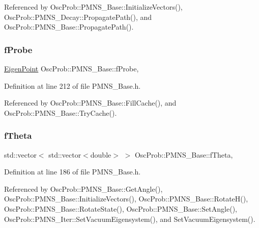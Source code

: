 Referenced by Osc\+Prob\+::\+P\+M\+N\+S\+\_\+\+Base\+::\+Initialize\+Vectors(), Osc\+Prob\+::\+P\+M\+N\+S\+\_\+\+Decay\+::\+Propagate\+Path(), and Osc\+Prob\+::\+P\+M\+N\+S\+\_\+\+Base\+::\+Propagate\+Path().

\mbox{\label{classOscProb_1_1PMNS__Base_ab1fe4800ee3ae48df4fc942dce00e0d3}} 
\subsubsection{\texorpdfstring{f\+Probe}{fProbe}}
{\footnotesize\ttfamily \hyperlink{structOscProb_1_1EigenPoint}{Eigen\+Point} Osc\+Prob\+::\+P\+M\+N\+S\+\_\+\+Base\+::f\+Probe\hspace{0.3cm}{\ttfamily [protected]}, {\ttfamily [inherited]}}



Definition at line 212 of file P\+M\+N\+S\+\_\+\+Base.\+h.



Referenced by Osc\+Prob\+::\+P\+M\+N\+S\+\_\+\+Base\+::\+Fill\+Cache(), and Osc\+Prob\+::\+P\+M\+N\+S\+\_\+\+Base\+::\+Try\+Cache().

\mbox{\label{classOscProb_1_1PMNS__Base_a1976887cd658dd86b2336c181f1470b4}} 
\subsubsection{\texorpdfstring{f\+Theta}{fTheta}}
{\footnotesize\ttfamily std\+::vector$<$ std\+::vector$<$double$>$ $>$ Osc\+Prob\+::\+P\+M\+N\+S\+\_\+\+Base\+::f\+Theta\hspace{0.3cm}{\ttfamily [protected]}, {\ttfamily [inherited]}}



Definition at line 186 of file P\+M\+N\+S\+\_\+\+Base.\+h.



Referenced by Osc\+Prob\+::\+P\+M\+N\+S\+\_\+\+Base\+::\+Get\+Angle(), Osc\+Prob\+::\+P\+M\+N\+S\+\_\+\+Base\+::\+Initialize\+Vectors(), Osc\+Prob\+::\+P\+M\+N\+S\+\_\+\+Base\+::\+Rotate\+H(), Osc\+Prob\+::\+P\+M\+N\+S\+\_\+\+Base\+::\+Rotate\+State(), Osc\+Prob\+::\+P\+M\+N\+S\+\_\+\+Base\+::\+Set\+Angle(), Osc\+Prob\+::\+P\+M\+N\+S\+\_\+\+Iter\+::\+Set\+Vacuum\+Eigensystem(), and Set\+Vacuum\+Eigensystem().

